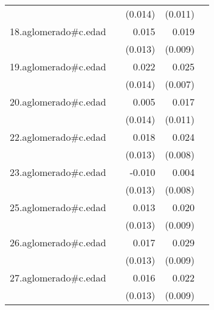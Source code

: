 {\begin{longtable}{l*{4}{D{.}{.}{-1}}}
            &                     &     (0.014)         &     (0.011)         &                     \\
\addlinespace
18.aglomerado#c.edad&                     &       0.015         &       0.019\sym{*}  &                     \\
            &                     &     (0.013)         &     (0.009)         &                     \\
\addlinespace
19.aglomerado#c.edad&                     &       0.022         &       0.025\sym{***}&                     \\
            &                     &     (0.014)         &     (0.007)         &                     \\
\addlinespace
20.aglomerado#c.edad&                     &       0.005         &       0.017         &                     \\
            &                     &     (0.014)         &     (0.011)         &                     \\
\addlinespace
22.aglomerado#c.edad&                     &       0.018         &       0.024\sym{**} &                     \\
            &                     &     (0.013)         &     (0.008)         &                     \\
\addlinespace
23.aglomerado#c.edad&                     &      -0.010         &       0.004         &                     \\
            &                     &     (0.013)         &     (0.008)         &                     \\
\addlinespace
25.aglomerado#c.edad&                     &       0.013         &       0.020\sym{*}  &                     \\
            &                     &     (0.013)         &     (0.009)         &                     \\
\addlinespace
26.aglomerado#c.edad&                     &       0.017         &       0.029\sym{**} &                     \\
            &                     &     (0.013)         &     (0.009)         &                     \\
\addlinespace
27.aglomerado#c.edad&                     &       0.016         &       0.022\sym{*}  &                     \\
            &                     &     (0.013)         &     (0.009)         &                     \\

\end{longtable}}
